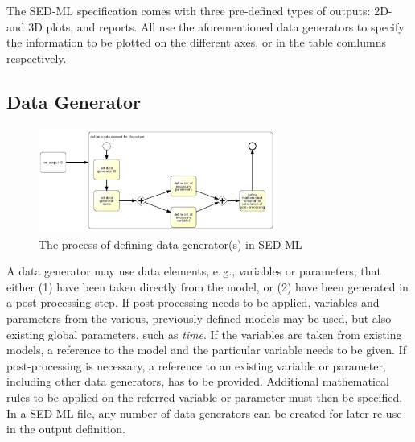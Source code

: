 The SED-ML specification comes with three pre-defined types of outputs: 2D- and 3D plots, and reports. All use the aforementioned data generators to specify the information to be plotted on the different axes, or in the table comlumns respectively.
\subsection{Data Generator}
\label{overview:dataGen}
%
\begin{figure}[h]
\centering
\includegraphics[width=0.7\textwidth]{images/bpmn/sedDataGeneratorOryx.png}
\caption{The process of defining data generator(s) in SED-ML}
\label{fig:workflowDataGenerator}
\end{figure}
%
A data generator may use data elements, e.\,g., variables or parameters, that either (1) have been taken directly from the model, or (2) have been generated in a post-processing step. If post-processing needs to be applied, variables and parameters from the various, previously defined models may be used, but also existing global parameters, such as \emph{time}.
If the variables are taken from existing models, a reference to the model and the particular variable needs to be given. 
If post-processing is necessary, a reference to an existing variable or parameter, including other data generators, has to be provided. Additional mathematical rules to be applied on the referred variable or parameter must then  be specified. 
%
In a SED-ML file, any number of data generators can be created for later re-use in the output definition.



